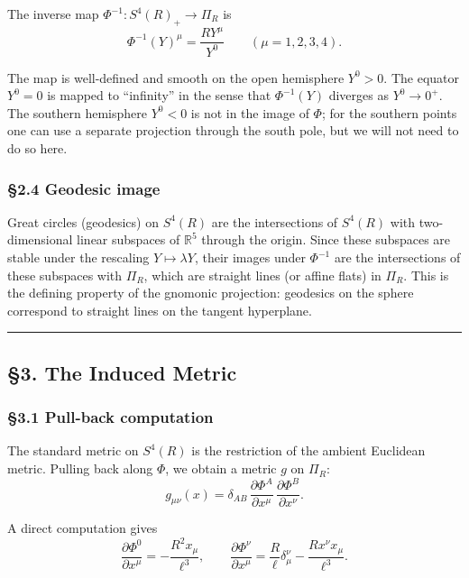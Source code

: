 \documentclass[a4paper,11pt]{article}
\theoremstyle{definition}
\begin{document}
The inverse map \(\Phi^{-1} : S^4(R)_+ \to \Pi_R\) is
\[\Phi^{-1}(Y)^\mu = \frac{R Y^\mu}{Y^0} \qquad (\mu = 1, 2, 3, 4).\]

The map is well-defined and smooth on the open hemisphere \(Y^0 > 0\).
The equator \(Y^0 = 0\) is mapped to ``infinity'' in the sense that
\(\Phi^{-1}(Y)\) diverges as \(Y^0 \to 0^+\). The southern hemisphere
\(Y^0 < 0\) is not in the image of \(\Phi\); for the southern points one
can use a separate projection through the south pole, but we will not
need to do so here.

\subsubsection{§2.4 Geodesic image}\label{geodesic-image}

Great circles (geodesics) on \(S^4(R)\) are the intersections of
\(S^4(R)\) with two-dimensional linear subspaces of \(\mathbb{R}^5\)
through the origin. Since these subspaces are stable under the rescaling
\(Y \mapsto \lambda Y\), their images under \(\Phi^{-1}\) are the
intersections of these subspaces with \(\Pi_R\), which are straight
lines (or affine flats) in \(\Pi_R\). This is the defining property of
the gnomonic projection: geodesics on the sphere correspond to straight
lines on the tangent hyperplane.

\begin{center}\rule{0.5\linewidth}{0.5pt}\end{center}

\subsection{§3. The Induced Metric}\label{the-induced-metric}

\subsubsection{§3.1 Pull-back computation}\label{pull-back-computation}

The standard metric on \(S^4(R)\) is the restriction of the ambient
Euclidean metric. Pulling back along \(\Phi\), we obtain a metric \(g\)
on \(\Pi_R\):
\[g_{\mu\nu}(x) = \delta_{AB}\, \frac{\partial \Phi^A}{\partial x^\mu}\, \frac{\partial \Phi^B}{\partial x^\nu}.\]

A direct computation gives
\[\frac{\partial \Phi^0}{\partial x^\mu} = -\frac{R^2 x_\mu}{\ell^3}, \qquad \frac{\partial \Phi^\nu}{\partial x^\mu} = \frac{R}{\ell} \delta^\nu_\mu - \frac{R x^\nu x_\mu}{\ell^3}.\]
\end{document}
